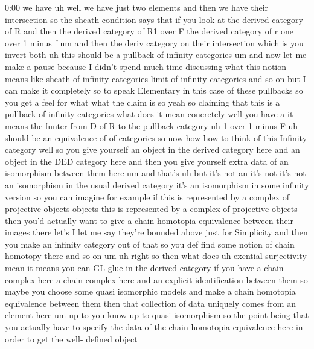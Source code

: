 \begin{unfinished}{0:00}
we  have  uh  well  we  have  just  two
elements  and  then  we  have  their
intersection  so  the  sheath  condition
says  that  if  you  look  at  the  derived
category  of  R  and  then  the  derived
category  of  R1  over  F  the  derived
category  of  r  one  over  1  minus  f  um  and
then  the  deriv  category  on  their
intersection  which  is  you  invert
both  uh  this  should  be  a  pullback  of
infinity
categories  um  and  now  let  me  make  a
pause  because  I  didn't  spend  much  time
discussing  what  this  notion  means  like
sheath  of  infinity  categories  limit  of
infinity  categories  and  so  on  but  I  can
make  it  completely  so  to  speak
Elementary  in  this  case  of  these
pullbacks  so  you  get  a  feel  for  what
what  the  claim  is
so  yeah  so  claiming  that  this  is  a
pullback  of  infinity  categories  what
does  it  mean  concretely  well  you  have  a
it  means  the  funter  from  D  of  R  to  the
pullback  category
uh  1  over  1  minus  F  uh  should  be  an
equivalence  of  of  categories
so  now  how  how  to  think  of  this  Infinity
category  well  so  you  give  yourself  an
object  in  the  derived  category  here  and
an  object  in  the  DED  category  here  and
then  you  give  yourself  extra  data  of  an
isomorphism  between  them
here  um  and
that's  uh  but  it's  not  an  it's  not  it's
not  an  isomorphism  in  the  usual  derived
category  it's  an  isomorphism  in  some
infinity  version  so  you  can  imagine  for
example  if  this  is  represented  by  a
complex  of  projective  objects  objects
this  is  represented  by  a  complex  of
projective  objects  then  you'd  actually
want  to  give  a  chain  homotopia
equivalence  between  their  images  there
let's  I  let  me  say  they're  bounded  above
just  for  Simplicity  and  then  you  make  an
infinity  category  out  of  that  so  you  def
find  some  notion  of  chain  homotopy  there
and  so  on
um  uh  right  so  then  what  does  uh
exential  surjectivity  mean  it  means  you
can  GL  glue  in  the  derived  category  if
you  have  a  chain  complex  here  a  chain
complex  here  and  an  explicit
identification  between  them  so  maybe  you
choose  some  quasi  isomorphic  models  and
make  a  chain  homotopia  equivalence
between  them  then  that  collection  of
data  uniquely  comes  from  an  element  here
um  up  to  you  know  up  to  quasi
isomorphism  so  the  point  being  that  you
actually  have  to  specify  the  data  of  the
chain  homotopia  equivalence  here  in
order  to  get  the  well-  defined  object

\end{unfinished}
